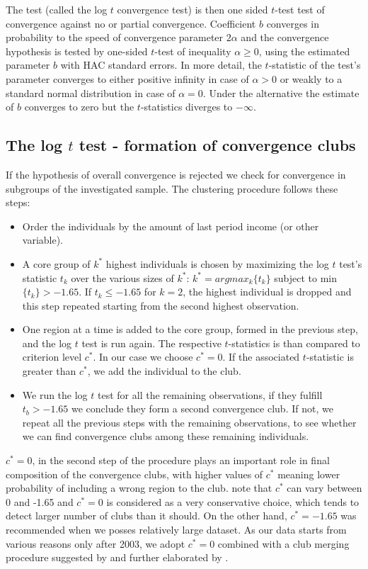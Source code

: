 \documentclass[11pt]{article}
\begin{document}
The test (called the log $t$ convergence test) is then one sided $t$-test test of convergence against no or partial convergence. Coefficient $b$ converges in probability to the speed of convergence parameter $2\alpha$ and the convergence hypothesis is tested by one-sided $t$-test of inequality \(\alpha \geq 0 \), using the estimated parameter $b$ with HAC standard errors. In more detail, the $t$-statistic of the test's parameter converges to either positive infinity in case of \(\alpha > 0 \) or weakly to a standard normal distribution in case of \(\alpha = 0\). Under the alternative the estimate of $b$ converges to zero but the $t$-statistics diverges to $-\infty$.



\subsection{The log $t$ test - formation of convergence clubs }
If the hypothesis of overall convergence is rejected we check for convergence in subgroups of the investigated sample. The clustering procedure follows these steps:
\begin{itemize}
    \item Order the individuals by the amount of last period income (or other variable).
    \item  A core group of $k^{*}$ highest individuals is chosen by maximizing the log $t$ test's statistic $t_{k}$ over the various sizes of $k^{*}$:
    \(k^{*} = arg max_{k}\{t_{k}\}\) subject to min \( \{t_{k}\}> -1.65\). If \(t_{k} \leq -1.65 \) for \(k=2\), the highest individual is dropped and this step repeated starting from the second highest observation. 
    \item One region at a time is added to the core group, formed in the previous step, and the log $t$ test is run again. The respective  $t$-statistics is than compared to criterion level $c^{*}$. In our case we choose $c^{*}=0$. If the associated $t$-statistic is greater than  $c^{*}$, we add the individual to the club.
    \item We run the log $t$ test for all the remaining observations, if they fulfill \(t_b > -1.65\) we conclude they form a second convergence club. If not, we repeat all the previous steps with the remaining observations, to see whether we can find convergence clubs among these remaining individuals.
\end{itemize}    

 \(c^{*} = 0\), in the second step of the procedure plays an important role in final composition of the convergence clubs, with higher values of $c^*$ meaning lower probability of including a wrong region to the club. \citet{phillips2009economic} note that $c^{*}$ can vary between 0 and -1.65 and $c^{*}=0$ is considered as a very conservative choice, which tends to detect larger number of clubs than it should. On the other hand, $c^{*}=-1.65$ was recommended when we posses relatively large dataset. As our data starts from various reasons only after 2003, we adopt $c^*= 0$ combined with a club merging procedure suggested by \citet{phillips2009economic} and further elaborated by \citet{bartkowska2012regional}. 
\end{document}
